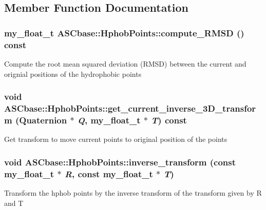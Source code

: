 \subsection{Member Function Documentation}
\subsubsection{\setlength{\rightskip}{0pt plus 5cm}my\_\-float\_\-t ASCbase::Hphob\-Points::compute\_\-RMSD () const\hspace{0.3cm}{\tt  [inline]}}\label{classASCbase_1_1HphobPoints_747fff02a3a0463f032470212a50e9e6}


Compute the root mean squared deviation (RMSD) between the current and orignial positions of the hydrophobic points 
\subsubsection{\setlength{\rightskip}{0pt plus 5cm}void ASCbase::Hphob\-Points::get\_\-current\_\-inverse\_\-3D\_\-transform (Quaternion $\ast$ {\em Q}, my\_\-float\_\-t $\ast$ {\em T}) const\hspace{0.3cm}{\tt  [inline]}}\label{classASCbase_1_1HphobPoints_130111b0a5617851d7ffde3387c48b80}


Get transform to move current points to original position of the points 
\subsubsection{\setlength{\rightskip}{0pt plus 5cm}void ASCbase::Hphob\-Points::inverse\_\-transform (const my\_\-float\_\-t $\ast$ {\em R}, const my\_\-float\_\-t $\ast$ {\em T})\hspace{0.3cm}{\tt  [inline]}}\label{classASCbase_1_1HphobPoints_116528abe8dfc536c786ac885e87dc02}


Transform the hphob points by the inverse transform of the transform given by R and T 
